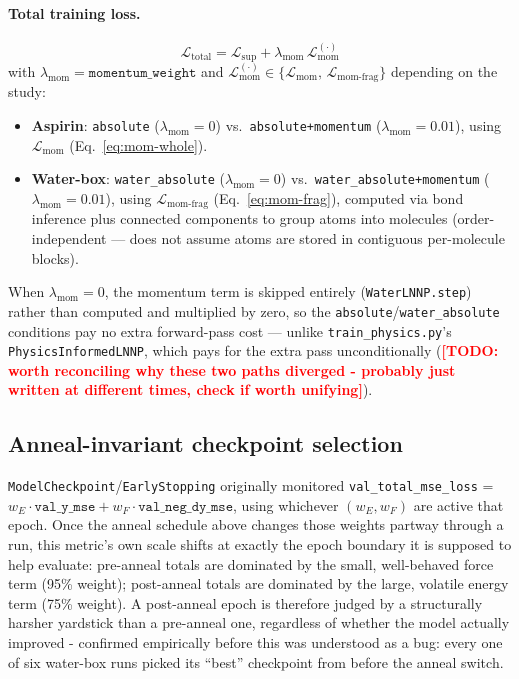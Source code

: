 \documentclass[11pt]{article}
\newcommand{\todo}[1]{\textcolor{red}{\textbf{[TODO: #1]}}}
\begin{document}
\paragraph{Total training loss.}
\begin{equation}
\mathcal{L}_{\mathrm{total}} = \mathcal{L}_{\mathrm{sup}} + \lambda_{\mathrm{mom}}\, \mathcal{L}_{\mathrm{mom}}^{(\cdot)}
\end{equation}
with $\lambda_{\mathrm{mom}} = \texttt{momentum\_weight}$ and
$\mathcal{L}_{\mathrm{mom}}^{(\cdot)} \in \{\mathcal{L}_{\mathrm{mom}},\,
\mathcal{L}_{\mathrm{mom\text{-}frag}}\}$ depending on the study:
\begin{itemize}
  \item \textbf{Aspirin}: \texttt{absolute} ($\lambda_{\mathrm{mom}}=0$) vs.\
  \texttt{absolute+momentum} ($\lambda_{\mathrm{mom}}=0.01$), using
  $\mathcal{L}_{\mathrm{mom}}$ (Eq.~\ref{eq:mom-whole}).
  \item \textbf{Water-box}: \texttt{water\_absolute} ($\lambda_{\mathrm{mom}}=0$)
  vs.\ \texttt{water\_absolute+momentum} ($\lambda_{\mathrm{mom}}=0.01$), using
  $\mathcal{L}_{\mathrm{mom\text{-}frag}}$ (Eq.~\ref{eq:mom-frag}), computed
  via bond inference plus connected components to group atoms into molecules
  (order-independent --- does not assume atoms are stored in contiguous
  per-molecule blocks).
\end{itemize}
When $\lambda_{\mathrm{mom}}=0$, the momentum term is skipped entirely
(\texttt{WaterLNNP.step}) rather than computed and multiplied by zero, so the
\texttt{absolute}/\texttt{water\_absolute} conditions pay no extra
forward-pass cost --- unlike \texttt{train\_physics.py}'s
\texttt{PhysicsInformedLNNP}, which pays for the extra pass unconditionally
(\todo{worth reconciling why these two paths diverged - probably just
written at different times, check if worth unifying}).

\subsection{Anneal-invariant checkpoint selection}
\label{sec:checkpoint-fix}

\texttt{ModelCheckpoint}/\texttt{EarlyStopping} originally monitored
\texttt{val\_total\_mse\_loss} = $w_E \cdot \texttt{val\_y\_mse} + w_F \cdot
\texttt{val\_neg\_dy\_mse}$, using whichever $(w_E, w_F)$ are active that
epoch. Once the anneal schedule above changes those weights partway through
a run, this metric's own scale shifts at exactly the epoch boundary it is
supposed to help evaluate: pre-anneal totals are dominated by the small,
well-behaved force term (95\% weight); post-anneal totals are dominated by
the large, volatile energy term (75\% weight). A post-anneal epoch is
therefore judged by a structurally harsher yardstick than a pre-anneal one,
regardless of whether the model actually improved - confirmed empirically
before this was understood as a bug: every one of six water-box runs picked
its ``best'' checkpoint from before the anneal switch.
\end{document}
